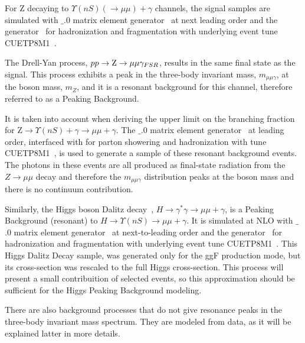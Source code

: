  For Z decaying to $\Upsilon(nS) (\rightarrow \mu\mu) + \gamma$  channels, the signal samples are simulated with  $\_$.0 matrix element generator~\cite{Alwall2014} at next leading order and the  generator~\cite{SJOSTRAND2008852,Sjostrand:2014zea} for hadronization and fragmentation with underlying event tune CUETP8M1~\cite{Khachatryan:2015pea}.

The Drell-Yan process, $pp \rightarrow \mathrm{Z} \rightarrow \mu\mu \gamma_{FSR}$, results in the same final state as the signal. This process exhibits a peak in the three-body invariant mass, $m_{\mu\mu\gamma}$, at the \Z boson mass, $m_{Z}$, and it is a resonant background for this channel, therefore referred to as a Peaking Background. 

It is taken into account when deriving the upper limit on the branching fraction for Z$\rightarrow \Upsilon(nS) + \gamma \rightarrow \mu\mu + \gamma$. The  $\_$.0 matrix element generator~\cite{Alwall2014} at leading order, interfaced with  for parton showering and hadronization with tune CUETP8M1~\cite{Khachatryan:2015pea}, is used to generate a sample of these resonant background events. The photons in these events are all produced as final-state radiation from the $ Z \rightarrow \mu\mu$ decay and therefore the $m_{\mu\mu\gamma}$ distribution peaks at the \Z boson mass and there is no continuum contribution.  

Similarly, the Higgs boson Dalitz decay~\cite{PhysRevD.55.5647}, $H \rightarrow \gamma^{*} \gamma\rightarrow \mu\mu + \gamma$, is a Peaking Background (resonant) to $H \rightarrow \Upsilon(nS) \rightarrow \mu\mu + \gamma$. It is simulated at NLO with  $\_$.0 matrix element generator~\cite{Alwall2014} at next-to-leading order and the  generator~\cite{SJOSTRAND2008852,Sjostrand:2014zea} for hadronization and fragmentation with underlying event tune CUETP8M1~\cite{Khachatryan:2015pea}. This Higgs Dalitz Decay sample, was generated only for the ggF production mode, but its cross-section was rescaled to the full Higgs cross-section. This process will present a small contribuition of selected events, so this approximation should be sufficient for the Higgs Peaking Background modeling.

There are also background processes that do not give resonance peaks in the three-body invariant mass spectrum. They are modeled from data, as it will be explained latter in more details.
 
